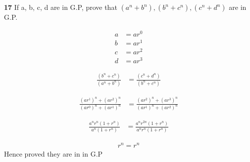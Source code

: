 \documentclass[journal,12pt,twocolumn]{IEEEtran}
\theoremstyle{remark}
\begin{document}


\vspace{3cm}

\title{}
\author{EE23BTECH11047 - Deepakreddy P
}
\maketitle
\newpage
\bigskip

\noindent \textbf{17} \quad 
If a, b, c, d are in G.P, prove that 
$ (a^{n} + b^{n}),(b^{n} + c^{n}),(c^{n} + d^{n}) $ are in G.P.\\
\solution

\begin{align}   
a &= ar^{0}\\
b &= ar^{1}\\
c &= ar^{2}\\
d &= ar^{3}
\end{align}

\bigskip
\begin{align} \frac{(b^n + c^n)}{(a^n + b^n)} &= \frac{(c^n + d^n)}{(b^n + c^n)} \end{align}

\begin{align} \frac{(ar^1)^n + (ar^2)^n}{(ar^0)^n + (ar^1)^n}  &= \frac{(ar^2)^n + (ar^3)^n}{(ar^1)^n + (ar^2)^n} \end{align}

\begin{align} \frac{a^n r^n(1 + r^n)}{a^n(1 + r^n)} &= \frac{a^n r^{2n}(1 + r^n)}{a^n r^n (1 + r^n)} \end{align}

\begin{align} r^n = r^n \end{align}
\bigskip
Hence proved they are in in G.P
\end{document}
